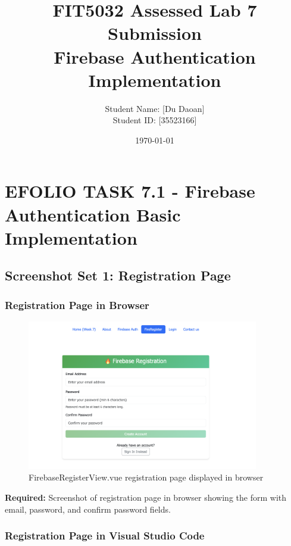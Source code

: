 \documentclass[11pt,a4paper]{article}
\title{\textbf{FIT5032 Assessed Lab 7 Submission\\Firebase Authentication Implementation}}
\author{Student Name: [Du Daoan]\\Student ID: [35523166]}
\date{\today}
\begin{document}
\maketitle

\newpage


\section{EFOLIO TASK 7.1 - Firebase Authentication Basic Implementation}

\subsection{Screenshot Set 1: Registration Page}

\subsubsection{Registration Page in Browser}

\begin{figure}[H]
     \centering
     \includegraphics[width=0.9\textwidth]{registration_browser.png}
     \caption{FirebaseRegisterView.vue registration page displayed in browser}
     \label{fig:reg_browser}
 \end{figure}

\textbf{Required:} Screenshot of registration page in browser showing the form with email, password, and confirm password fields.

\subsubsection{Registration Page in Visual Studio Code}
\end{document}
